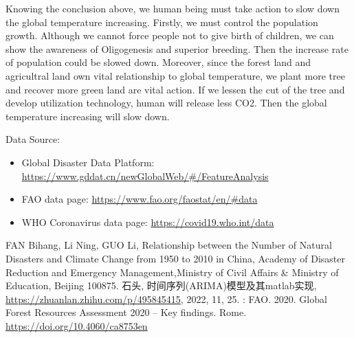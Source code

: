 \documentclass{apmcmthesis}
\begin{document}
Knowing the conclusion above, we human being must take action to slow down the global temperature increasing.
Firstly, we must control the population growth.
Although we cannot force people not to give birth of children, we can show the awareness of Oligogenesis and superior breeding.
Then the increase rate of population could be slowed down.
Moreover, since the forest land and agricultral land own vital relationship to global temperature, we plant more tree and recover more green land are vital action.
If we lessen the cut of the tree and develop utilization technology, human will release less CO2.
Then the global temperature increasing will slow down.


\newpage

Data Source:
\begin{itemize}
  \item Global Disaster Data Platform: \url{https://www.gddat.cn/newGlobalWeb/#/FeatureAnalysis}
  \item FAO data page: \url{https://www.fao.org/faostat/en/#data}
  \item WHO Coronavirus data page: \url{https://covid19.who.int/data}
\end{itemize}

\begin{thebibliography}{9}%
 FAN Bihang, Li Ning, GUO Li, Relationship between the Number of Natural Disasters and Climate Change from 1950 to 2010 in China, Academy of Disaster Reduction and Emergency Management,Ministry of Civil Affairs \& Ministry of Education, Beijing 100875.
 石头, 时间序列(ARIMA)模型及其matlab实现, \url{https://zhuanlan.zhihu.com/p/495845415}, 2022, 11, 25.
 : FAO. 2020. Global Forest Resources Assessment 2020 – Key findings. Rome. \url{https://doi.org/10.4060/ca8753en}
\end{thebibliography}

\newpage
\end{document}
